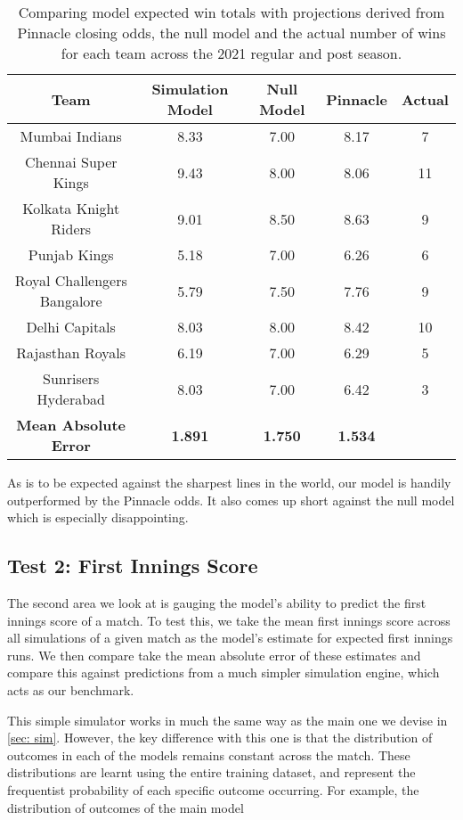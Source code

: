 \begin{table}[ht]
\vspace{0.5em}
\centering
\begin{tabular} {c c c c c} \toprule
    {Team} & {Simulation Model} & {Null Model} & {Pinnacle} & {Actual} \\ \midrule
     Mumbai Indians & 8.33 & 7.00 & 8.17 & 7 \\
     Chennai Super Kings & 9.43 & 8.00 & 8.06 & 11 \\
     Kolkata Knight Riders & 9.01 & 8.50 & 8.63 & 9 \\
     Punjab Kings & 5.18 & 7.00 & 6.26 & 6 \\
     Royal Challengers Bangalore & 5.79 & 7.50 & 7.76 & 9 \\
     Delhi Capitals & 8.03 & 8.00 & 8.42 & 10 \\
     Rajasthan Royals & 6.19 & 7.00 & 6.29 & 5 \\
     Sunrisers Hyderabad & 8.03 & 7.00 & 6.42 & 3 \\ \midrule
     \textbf{Mean Absolute Error} & \textbf{1.891} & \textbf{1.750} & \textbf{1.534} & \\ \bottomrule
\end{tabular}
\caption{Comparing model expected win totals with projections derived from Pinnacle closing odds, the null model and the actual number of wins for each team across the 2021 regular and post season.}
\label{table: ex wins}
\end{table}

As is to be expected against the sharpest lines in the world, our model is handily outperformed by the Pinnacle odds. It also comes up short against the null model which is especially disappointing.

\subsection{Test 2: First Innings Score}

The second area we look at is gauging the model's ability to predict the first innings score of a match. To test this, we take the mean first innings score across all simulations of a given match as the model's estimate for expected first innings runs. We then compare take the mean absolute error of these estimates and compare this against predictions from a much simpler simulation engine, which acts as our benchmark.

This simple simulator works in much the same way as the main one we devise in \cref{sec: sim}. However, the key difference with this one is that the distribution of outcomes in each of the models remains constant across the match. These distributions are learnt using the entire training dataset, and represent the frequentist probability of each specific outcome occurring. For example, the distribution of outcomes of the main model 

